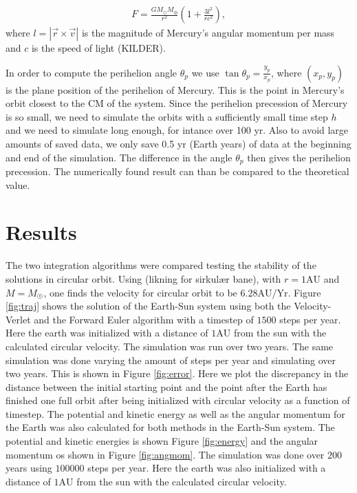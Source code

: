 \documentclass[twocolumn]{aastex62}
\begin{document}
\begin{align}\label{eq:relcorrection}
    F = \frac{G M_\odot M_\oplus}{r^2}\left(1 + \frac{3l^2}{r c^2}\right),
\end{align}
where $l = |\vec{r}\times \vec{v}|$ is the magnitude of Mercury's angular
momentum per mass and $c$ is the speed of light (KILDER).

In order to compute the perihelion angle $\theta_p$ we use $\tan \theta_p =
\frac{y_p}{x_p}$, where $(x_p, y_p)$ is the plane position of the perihelion of
Mercury. This is the point in Mercury's orbit closest to the CM of the system.
Since the perihelion precession of Mercury is so small, we need to simulate the
orbits with a sufficiently small time step $h$ and we need to simulate long
enough, for intance over 100 yr. Also to avoid large amounts of
saved data, we only save 0.5 yr (Earth years) of data at the beginning and end of the
simulation. The difference in the angle $\theta_p$ then gives the perihelion
precession. The numerically found result can than be compared to the theoretical
value.

\section{Results} \label{sec:results}
The two integration algorithms were compared testing the stability of the
solutions in circular orbit. Using (likning for sirkulær bane), with
$r=1\mathrm{AU}$ and $M=M_{\astrosun}$, one finds the velocity for circular
orbit to be $6.28\mathrm{AU/Yr}$. Figure \ref{fig:traj} shows the solution of
the Earth-Sun system using both the Velocity-Verlet and the Forward Euler
algorithm with a timestep of $1500$ steps per year. Here the earth was
initialized with a distance of $1\mathrm{AU}$ from the sun with the calculated
circular velocity. The simulation was run over two years. The same simulation
was done varying the amount of steps per year and simulating over two years.
This is shown in Figure \ref{fig:error}. Here we plot the discrepancy in the
distance between the initial starting point and the point after the Earth has
finished one full orbit after being initialized with circular velocity as a
function of timestep. The potential and kinetic energy as well as the angular
momentum for the Earth was also calculated for both methods in the Earth-Sun system. The
potential and kinetic energies is shown Figure \ref{fig:energy} and the angular
momentum os shown in Figure \ref{fig:angmom}. The simulation was done over $200$
years using $100000$ steps per year. Here the earth was also initialized with a
distance of $1\mathrm{AU}$ from the sun with the calculated circular velocity.
\end{document}
